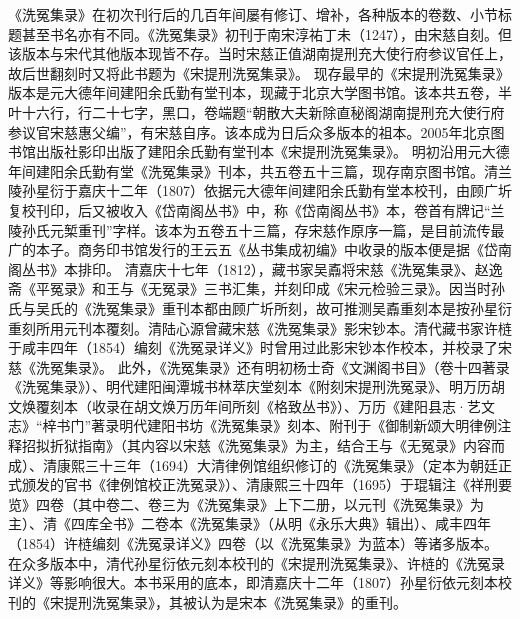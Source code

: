 \documentclass[12pt,UTF8]{ctexbook}
\begin{document}
《洗冤集录》在初次刊行后的几百年间屡有修订、增补，各种版本的卷数、小节标题甚至书名亦有不同。《洗冤集录》初刊于南宋淳祐丁未（1247），由宋慈自刻。但该版本与宋代其他版本现皆不存。当时宋慈正值湖南提刑充大使行府参议官任上，故后世翻刻时又将此书题为《宋提刑洗冤集录》。
现存最早的《宋提刑洗冤集录》版本是元大德年间建阳余氏勤有堂刊本，现藏于北京大学图书馆。该本共五卷，半叶十六行，行二十七字，黑口，卷端题“朝散大夫新除直秘阁湖南提刑充大使行府参议官宋慈惠父编”，有宋慈自序。该本成为日后众多版本的祖本。2005年北京图书馆出版社影印出版了建阳余氏勤有堂刊本《宋提刑洗冤集录》。
明初沿用元大德年间建阳余氏勤有堂《洗冤集录》刊本，共五卷五十三篇，现存南京图书馆。清兰陵孙星衍于嘉庆十二年（1807）依据元大德年间建阳余氏勤有堂本校刊，由顾广圻复校刊印，后又被收入《岱南阁丛书》中，称《岱南阁丛书》本，卷首有牌记“兰陵孙氏元椠重刊”字样。该本为五卷五十三篇，存宋慈作原序一篇，是目前流传最广的本子。商务印书馆发行的王云五《丛书集成初编》中收录的版本便是据《岱南阁丛书》本排印。
清嘉庆十七年（1812），藏书家吴鼒将宋慈《洗冤集录》、赵逸斋《平冤录》和王与《无冤录》三书汇集，并刻印成《宋元检验三录》。因当时孙氏与吴氏的《洗冤集录》重刊本都由顾广圻所刻，故可推测吴鼒重刻本是按孙星衍重刻所用元刊本覆刻。清陆心源曾藏宋慈《洗冤集录》影宋钞本。清代藏书家许梿于咸丰四年（1854）编刻《洗冤录详义》时曾用过此影宋钞本作校本，并校录了宋慈《洗冤集录》。
此外，《洗冤集录》还有明初杨士奇《文渊阁书目》（卷十四著录《洗冤集录》）、明代建阳闽潭城书林萃庆堂刻本《附刻宋提刑洗冤录》、明万历胡文焕覆刻本（收录在胡文焕万历年间所刻《格致丛书》）、万历《建阳县志·艺文志》“梓书门”著录明代建阳书坊《洗冤集录》刻本、附刊于《御制新颂大明律例注释招拟折狱指南》（其内容以宋慈《洗冤集录》为主，结合王与《无冤录》内容而成）、清康熙三十三年（1694）大清律例馆组织修订的《洗冤集录》（定本为朝廷正式颁发的官书《律例馆校正洗冤录》）、清康熙三十四年（1695）于琨辑注《祥刑要览》四卷（其中卷二、卷三为《洗冤集录》上下二册，以元刊《洗冤集录》为主）、清《四库全书》二卷本《洗冤集录》（从明《永乐大典》辑出）、咸丰四年（1854）许梿编刻《洗冤录详义》四卷（以《洗冤集录》为蓝本）等诸多版本。
在众多版本中，清代孙星衍依元刻本校刊的《宋提刑洗冤集录》、许梿的《洗冤录详义》等影响很大。本书采用的底本，即清嘉庆十二年（1807）孙星衍依元刻本校刊的《宋提刑洗冤集录》，其被认为是宋本《洗冤集录》的重刊。
\end{document}
